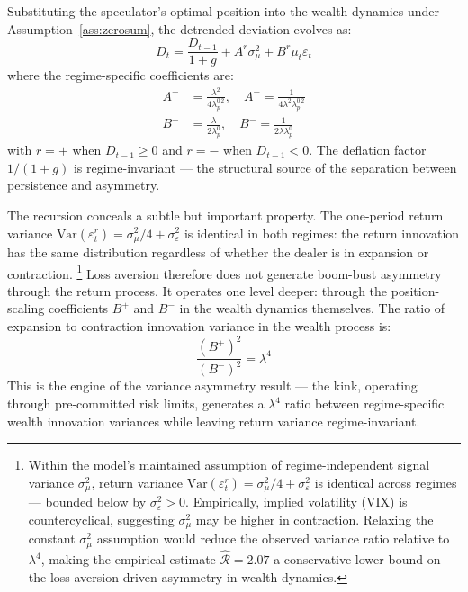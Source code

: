 \documentclass[12pt,a4paper]{article}
\theoremstyle{definition}
\begin{document}
Substituting the speculator's optimal position into the wealth dynamics
under Assumption~\ref{ass:zerosum}, the detrended deviation evolves as:
\begin{equation}
  D_t = \frac{D_{t-1}}{1+g} + A^r\sigma^2_\mu + B^r\mu_t\varepsilon_t
  \label{eq:deviation_recursion}
\end{equation}
where the regime-specific coefficients are:
\begin{align}
  A^+ &= \frac{\lambda^2}{4\lambda^{0\,2}_p}, \quad
  A^- = \frac{1}{4\lambda^2\lambda^{0\,2}_p}
  \label{eq:Ar_coeff} \\
  B^+ &= \frac{\lambda}{2\lambda^0_p}, \quad
  B^- = \frac{1}{2\lambda\lambda^0_p}
  \label{eq:Br_coeff}
\end{align}
with $r = +$ when $D_{t-1} \geq 0$ and $r = -$ when $D_{t-1} < 0$. The
deflation factor $1/(1+g)$ is regime-invariant --- the structural source
of the separation between persistence and asymmetry.

The recursion conceals a subtle but important property. The one-period
return variance $\text{Var}(\varepsilon^r_t) = \sigma^2_\mu/4 +
\sigma^2_\varepsilon$ is identical in both regimes: the return
innovation has the same distribution regardless of whether the dealer
is in expansion or contraction.%
\footnote{Within the model's maintained assumption of
regime-independent signal variance $\sigma^2_\mu$, return variance
$\text{Var}(\varepsilon^r_t) = \sigma^2_\mu/4 + \sigma^2_\varepsilon$
is identical across regimes --- bounded below by
$\sigma^2_\varepsilon > 0$. Empirically, implied volatility (VIX) is
countercyclical, suggesting $\sigma^2_\mu$ may be higher in contraction.
Relaxing the constant $\sigma^2_\mu$ assumption would reduce the
observed variance ratio relative to $\lambda^4$, making the empirical
estimate $\hat{\mathcal{R}} = 2.07$ a conservative lower bound on the
loss-aversion-driven asymmetry in wealth dynamics.}
Loss aversion therefore does not generate boom-bust asymmetry through
the return process. It operates one level deeper: through the
position-scaling coefficients $B^+$ and $B^-$ in the wealth dynamics
themselves. The ratio of expansion to contraction innovation variance
in the wealth process is:
\begin{equation}
  \frac{(B^+)^2}{(B^-)^2} = \lambda^4
  \label{eq:variance_ratio}
\end{equation}
This is the engine of the variance asymmetry result --- the kink,
operating through pre-committed risk limits, generates a $\lambda^4$
ratio between regime-specific wealth innovation variances while leaving
return variance regime-invariant.
\end{document}
